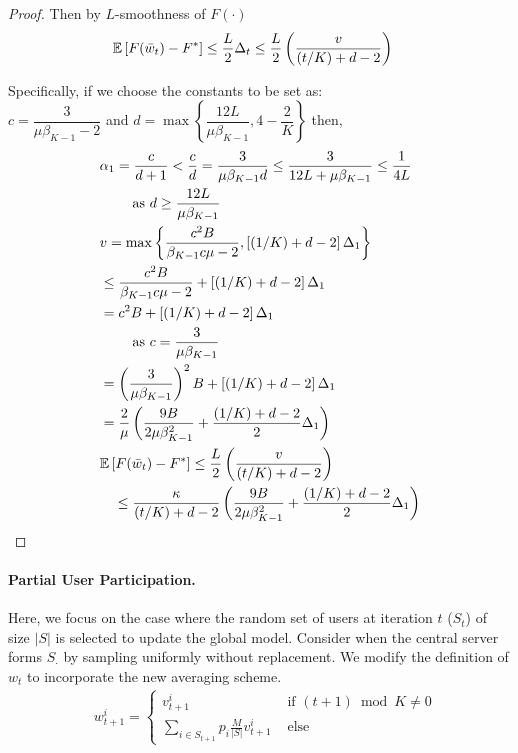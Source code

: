 \begin{proof}
    Then by $L$-smoothness of $F(\cdot)$
    \begin{align*}
        & \mathbb{E} \left[ F(\Bar{w}_t) - F^* \right] \leq \dfrac{L}{2} \Delta_t \leq \dfrac{L}{2} \left( \dfrac{v}{(t/K) + d - 2} \right)
    \end{align*}
    
    Specifically, if we choose the constants to be set as: \\
    $c = \dfrac{3}{\mu \beta_{K - 1} - 2}$ and $d = \max \left\{ \dfrac{12L}{\mu \beta_{K - 1}}, 4 - \dfrac{2}{K}\right\}$ then,
    \begin{align*}
        \allowdisplaybreaks
        & \alpha_1 = \dfrac{c}{d + 1} < \dfrac{c}{d} = \dfrac{3}{\mu \beta_{K - 1} d} \leq \dfrac{3}{12L + \mu \beta_{K - 1}} \leq \dfrac{1}{4L} \\
        & \qquad \textrm{ as } d \geq \dfrac{12L}{\mu \beta_{K - 1}} \\
        & v = \max \left\{ \dfrac{c^2 B}{\beta_{K - 1} c \mu - 2}, \left[ (1/K) + d - 2 \right] \Delta_1 \right\} \\
        & \leq \dfrac{c^2 B}{\beta_{K - 1} c \mu - 2} + \left[ (1/K) + d - 2 \right] \Delta_1 \\
        & = c^2 B + \left[ (1/K) + d - 2 \right] \Delta_1 \\
        & \qquad \textrm{ as } c = \dfrac{3}{\mu \beta_{K - 1}} \\
        & = \left( \dfrac{3}{\mu \beta_{K - 1}} \right)^2 B + \left[ (1/K) + d - 2 \right] \Delta_1 \\
        & = \dfrac{2}{\mu} \left( \dfrac{9B}{2 \mu \beta_{K - 1}^2} + \dfrac{(1/K) + d - 2}{2} \Delta_1 \right) \\
        & \mathbb{E} \left[ F(\Bar{w}_t) - F^* \right] \leq \dfrac{L}{2} \left( \dfrac{v}{(t/K) + d - 2} \right) \\
        & \quad \leq \dfrac{\kappa}{(t/K) + d - 2} \left( \dfrac{9B}{2 \mu \beta_{K - 1}^2} + \dfrac{(1/K) + d - 2}{2} \Delta_1 \right)
    \end{align*}
\end{proof}


\paragraph{Partial User Participation.}
Here, we focus on the case where the random set of users at iteration $t$ ($S_t$) of size $\lvert S \rvert$ is selected to update the global model.
Consider when the central server forms $S_\cdot$ by sampling uniformly without replacement.
We modify the definition of $w_t$ to incorporate the new averaging scheme.
\begin{align*}
    & w_{t + 1}^i = \begin{cases}
        v_{t + 1}^i & \textrm{ if } (t + 1) \bmod K \neq 0 \\
        \sum_{i \in S_{t + 1}} p_i \frac{M}{\lvert S \rvert} v_{t + 1}^i & \textrm{ else }
    \end{cases} 
\end{align*}

